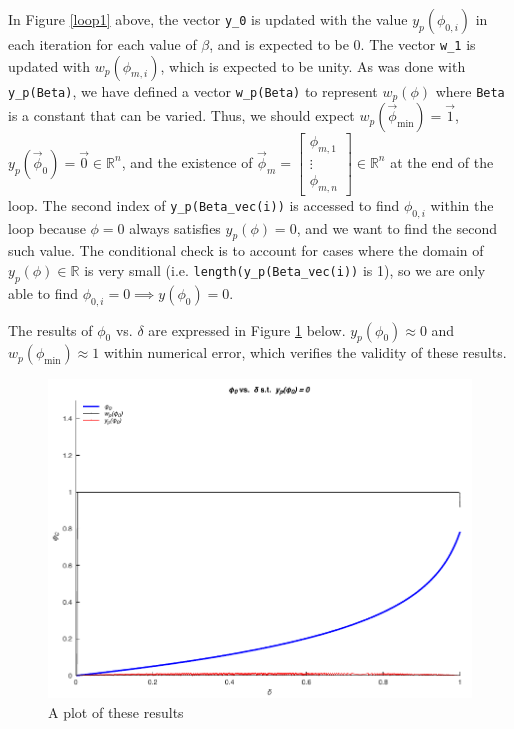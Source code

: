 In Figure \ref{loop1} above, the vector \verb|y_0| is updated with the value $y_p(\phi_{0,i})$ in each iteration
for each value of $\beta$, and is expected to be 0. The vector \verb|w_1| is updated with $w_p(\phi_{m,i})$, which is expected to be unity. As was done with \verb|y_p(Beta)|, 
we have defined a vector \verb|w_p(Beta)| to represent $w_p(\phi)$ where \verb|Beta| is a constant that can be varied.
Thus, we should expect $w_p(\vec\phi_\mathrm{min})=\vec{1}$, $y_p(\vec\phi_0)=\vec{0}\in \mathbb{R}^n$, and the existence of $\vec\phi_m=\begin{bmatrix}\phi_{m,1}\\\vdots\\\phi_{m,n}\end{bmatrix}\in \mathbb{R}^n$ at the end of the loop.
The second index of \verb|y_p(Beta_vec(i))| is accessed to find $\phi_{0,i}$ within the loop because $\phi=0$ always satisfies $y_p(\phi)=0$, and we want to find the second such value.
The conditional check is to account for cases where the domain of $y_p(\phi)\in \mathbb{R}$ is very small (i.e. \verb|length(y_p(Beta_vec(i))| is 1), so we are only able to find $\phi_{0,i}=0\implies y(\phi_0)=0$.

The results of $\phi_0$ vs. $\delta$ are expressed in Figure \ref{yminplot} below. $y_p(\phi_0)\approx 0$ and $w_p(\phi_\mathrm{min})\approx 1$ within numerical error, which verifies the validity of these results.

\begin{figure}[H]
    \centering
    \includegraphics{plots/phi_delta_y.pdf}
    \caption{A plot of these results}\label{yminplot}
\end{figure}

